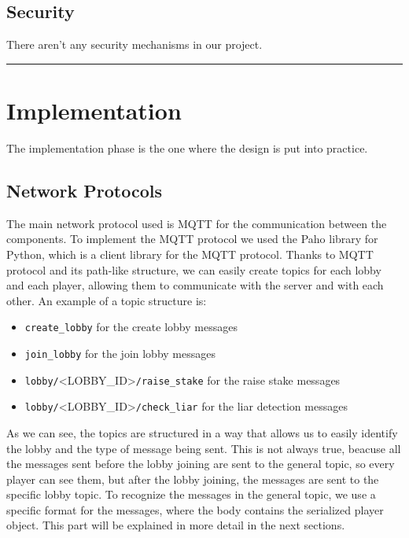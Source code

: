 \documentclass{scrartcl}
\begin{document}
\subsection{Security}\label{security}

There aren't any security mechanisms in our project. \newline


\begin{center}\rule{0.5\linewidth}{0.5pt}\end{center}

\section{Implementation}\label{implementation}

The implementation phase is the one where the design is put into practice.
\subsection{Network Protocols}\label{network-protocols}
The main network protocol used is MQTT for the communication between the components.
To implement the MQTT protocol we used the Paho library for Python, which is a client library for the MQTT protocol. \newline
Thanks to MQTT protocol and its path-like structure, we can easily create topics for each lobby and each player, allowing them to communicate with the server and with each other. \newline
An example of a topic structure is:
\begin{itemize}
    \item \texttt{create\_lobby} for the create lobby messages
    \item \texttt{join\_lobby} for the join lobby messages
    \item \texttt{lobby/}\textless LOBBY\_ID\textgreater\texttt{/raise\_stake} for the raise stake messages
    \item \texttt{lobby/}\textless LOBBY\_ID\textgreater\texttt{/check\_liar} for the liar detection messages
\end{itemize}

As we can see, the topics are structured in a way that allows us to easily identify the lobby and the type of message being sent. This is not always true, beacuse all the messages sent before the lobby joining are sent to the general topic, so every player can see them, but after the lobby joining, the messages are sent to the specific lobby topic. \newline
To recognize the messages in the general topic, we use a specific format for the messages, where the body contains the serialized player object. This part will be explained in more detail in the next sections. \newline
\end{document}
